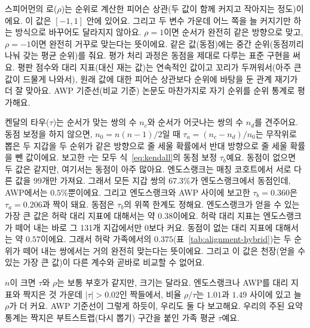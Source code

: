 
스피어먼의 로($\rho$)는 순위로 계산한 피어슨 상관(두 값이 함께 커지고 작아지는 정도)이에요. 이 값은 $[-1,1]$ 안에 있어요. 그리고 두 변수 가운데 어느 쪽을 늘 커지기만 하는 방식으로 바꾸어도 달라지지 않아요. $\rho=1$이면 순서가 완전히 같은 방향으로 맞고, $\rho=-1$이면 완전히 거꾸로 맞는다는 뜻이에요. 같은 값(동점)에는 중간 순위(동점끼리 나눠 갖는 평균 순위)를 줘요. 평가 처리 과정은 동점을 제대로 다루는 표준 구현을 써요. 평판 점수와 대리 지표(대신 재는 값)는 연속적인 값이고 꼬리가 두꺼워서(아주 큰 값이 드물게 나와서), 원래 값에 대한 피어슨 상관보다 순위에 바탕을 둔 관계 재기가 더 잘 맞아요. AWP 기준선(비교 기준) 논문도 마찬가지로 자기 순위를 순위 통계로 평가해요.


켄달의 타우($\tau$)는 순서가 맞는 쌍의 수 $n_c$와 순서가 어긋나는 쌍의 수 $n_d$를 견주어요. 동점 보정을 하지 않으면, $n_0=n(n-1)/2$일 때 $\tau_a=(n_c-n_d)/n_0$는 무작위로 뽑은 두 지갑을 두 순위가 같은 방향으로 줄 세울 확률에서 반대 방향으로 줄 세울 확률을 뺀 값이에요. 보고한 $\tau$는 모두 식~\eqref{eq:kendall}의 동점 보정 $\tau_b$예요. 동점이 없으면 두 값은 같지만, 여기서는 동점이 아주 많아요. 엔도스랭크는 매칭 코호트에서 서로 다른 값을 $99$개만 가져요. 그래서 모든 지갑 쌍의 $67.3\%$가 엔도스랭크에서 동점인데, AWP에서는 $0.5\%$뿐이에요. 그리고 엔도스랭크와 AWP 사이에 보고한 $\tau_b=0.360$은 $\tau_a=0.206$과 짝이 돼요. 동점은 $\tau_b$의 위쪽 한계도 정해요. 엔도스랭크가 얻을 수 있는 가장 큰 값은 허락 대리 지표에 대해서는 약 $0.38$이에요. 허락 대리 지표는 엔도스랭크가 떼어 내는 바로 그 131개 지갑에서만 0보다 커요. 동점이 없는 대리 지표에 대해서는 약 $0.57$이에요. 그래서 허락 가족에서의 $0.375$(표~\ref{tab:alignment-hybrid})는 두 순위가 떼어 내는 쌍에서는 거의 완전히 맞는다는 뜻이에요. 그리고 이 값은 천장(얻을 수 있는 가장 큰 값)이 다른 계수와 곧바로 비교할 수 없어요.

$n$이 크면 $\tau$와 $\rho$는 보통 부호가 같지만, 크기는 달라요. 엔도스랭크나 AWP를 대리 지표와 짝지은 것 가운데 $|\tau|>0.02$인 짝들에서, 비율 $\rho/\tau$는 $1.01$과 $1.49$ 사이에 있고 늘 $\rho$가 더 커요. AWP 기준선이 그렇게 하듯이, 우리도 둘 다 보고해요. 우리의 주된 요약 통계는 짝지은 부트스트랩(다시 뽑기) 구간을 붙인 가족 평균 $\tau$예요.


